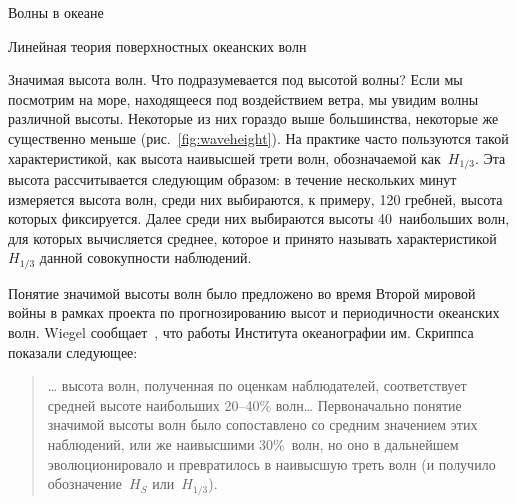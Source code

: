 \begin{chapter}{Волны в океане}
\begin{section}{Линейная теория поверхностных океанских волн}
\begin{paragraph}{Значимая высота волн.}
Что подразумевается под высотой волны? 
Если мы посмотрим на море, находящееся под воздействием ветра, мы увидим
волны различной высоты. Некоторые из них гораздо выше большинства,
некоторые же существенно меньше (рис.~\ref{fig:waveheight}). 
На практике часто пользуются такой характеристикой, как высота наивысшей
трети волн, обозначаемой как~$H_{1/3}$. Эта высота рассчитывается 
следующим образом: в течение нескольких минут измеряется высота волн,
среди них выбираются, к примеру, 120 гребней, высота которых фиксируется.
Далее среди них выбираются высоты 40~наибольших волн, для которых вычисляется
среднее, которое и принято называть характеристикой~$H_{1/3}$ данной 
совокупности наблюдений.
%

Понятие значимой высоты волн было предложено во время Второй мировой войны
в рамках проекта по прогнозированию высот и периодичности океанских волн.
Wiegel сообщает~\cite[стр.~198]{Wiegel:1964}, что работы Института океанографии
им. Скриппса показали следующее:
%
\begin{quote}
\ldots{} высота волн, полученная по оценкам наблюдателей, соответствует 
средней высоте наибольших 20--40\% волн\ldots{} 
Первоначально понятие значимой высоты волн было сопоставлено со средним 
значением этих наблюдений, или же наивысшими 30\%~волн, но оно в дальнейшем
эволюционировало и превратилось в наивысшую треть волн (и получило 
обозначение~$H_S$ или~$H_{1/3}$).
%
\end{quote}


\end{paragraph}
\end{section}
\end{chapter}
